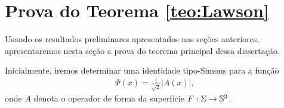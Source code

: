 \section{Prova do Teorema \ref{teo:Lawson}}

Usando os resultados preliminares apresentados nas se\c c\~oes
anteriores, apresentaremos nesta se\c c\~ao a prova do teorema
principal dessa disserta\c c\~ao. 

\vspace{.2cm}

Inicialmente, iremos determinar uma identidade tipo-Simons para
a fun\c c\~ao
\begin{eqnarray}\label{eq:PsiA(x)}
\Psi(x)=\frac{1}{\sqrt2}|A(x)|,
\end{eqnarray}
onde $A$ denota o operador de forma da superf\'icie $F:\Sigma\to\mathbb{S}^3$.

